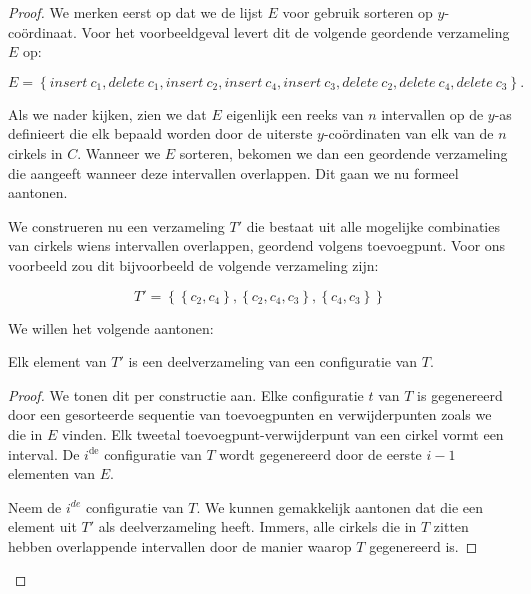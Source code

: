 \begin{proof}
We merken eerst op dat we de lijst $E$ voor gebruik sorteren op
$y$-co\"ordinaat. Voor het voorbeeldgeval levert dit de volgende
geordende verzameling $E$ op: 

\[E = \left\{insert\ c_1, delete\ c_1,
insert\ c_2, insert\ c_4, insert\ c_3, delete\ c_2, delete\ c_4,
delete\ c_3 \right\}.\]

Als we nader kijken, zien we dat $E$ eigenlijk een reeks van $n$
intervallen op de $y$-as definieert die elk bepaald worden door de
uiterste $y$-co\"ordinaten van elk van de $n$ cirkels in $C$. Wanneer
we $E$ sorteren, bekomen we dan een geordende verzameling die aangeeft
wanneer deze intervallen overlappen. Dit gaan we nu formeel aantonen.

We construeren nu een verzameling $T'$ die bestaat uit alle mogelijke
combinaties van cirkels wiens intervallen overlappen, geordend volgens
toevoegpunt. Voor ons voorbeeld zou dit bijvoorbeeld de volgende
verzameling zijn:

\[T' = \left\{\left\{c_2,c_4\right\},\left\{c_2,c_4,c_3\right\},\left\{c_4,c_3\right\}\right\}\]

We willen het volgende aantonen:

\begin{lemma}
Elk element van $T'$ is een deelverzameling van een configuratie van $T$.
\label{lemma:intervals}
\end{lemma}
\begin{proof}
We tonen dit per constructie aan. Elke configuratie $t$ van $T$ is
gegenereerd door een gesorteerde sequentie van toevoegpunten en
verwijderpunten zoals we die in $E$ vinden. Elk tweetal
toevoegpunt-verwijderpunt van een cirkel vormt een interval. De
$i^{\textrm{de}}$ configuratie van $T$ wordt gegenereerd door de
eerste $i - 1$ elementen van $E$. 

Neem de $i^{de}$ configuratie van $T$. We kunnen gemakkelijk aantonen
dat die een element uit $T'$ als deelverzameling heeft. Immers, alle
cirkels die in $T$ zitten hebben overlappende intervallen door de
manier waarop $T$ gegenereerd is.




\end{proof}
\end{proof}
